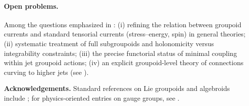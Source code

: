 \documentclass[11pt]{article}
\begin{document}
\paragraph{Open problems.}
Among the questions emphasized in \citep{CostaA2015,CostaB2018}: (i) refining the relation between groupoid currents and standard tensorial currents (stress--energy, spin) in general theories; (ii) systematic treatment of full subgroupoids and holonomicity versus integrability constraints; (iii) the precise functorial status of minimal coupling within jet groupoid actions; (iv) an explicit groupoid-level theory of connections curving to higher jets (see \citealp{Paycha2022}).

\bigskip
\noindent\textbf{Acknowledgements.} Standard references on Lie groupoids and algebroids include \citep{WikipediaLieGroupoid}; for physics-oriented entries on gauge groups, see \citep{nlabGaugeGroup}.



\end{document}
